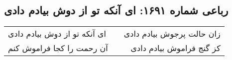 \begin{center}
\section*{رباعی شماره ۱۶۹۱: ای آنکه تو از دوش بیادم دادی}
\label{sec:1691}
\begin{longtable}{l p{0.5cm} r}
ای آنکه تو از دوش بیادم دادی
&&
زان حالت پرجوش بیادم دادی
\\
آن رحمت را کجا فراموش کنم
&&
کز گنج فراموش بیادم دادی
\\
\end{longtable}
\end{center}
